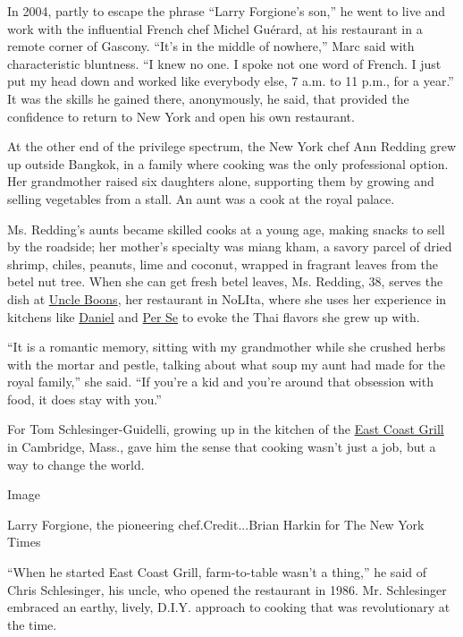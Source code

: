 In 2004, partly to escape the phrase ``Larry Forgione's son,'' he went
to live and work with the influential French chef Michel Guérard, at his
restaurant in a remote corner of Gascony. ``It's in the middle of
nowhere,'' Marc said with characteristic bluntness. ``I knew no one. I
spoke not one word of French. I just put my head down and worked like
everybody else, 7 a.m. to 11 p.m., for a year.'' It was the skills he
gained there, anonymously, he said, that provided the confidence to
return to New York and open his own restaurant.

At the other end of the privilege spectrum, the New York chef Ann
Redding grew up outside Bangkok, in a family where cooking was the only
professional option. Her grandmother raised six daughters alone,
supporting them by growing and selling vegetables from a stall. An aunt
was a cook at the royal palace.

Ms. Redding's aunts became skilled cooks at a young age, making snacks
to sell by the roadside; her mother's specialty was miang kham, a savory
parcel of dried shrimp, chiles, peanuts, lime and coconut, wrapped in
fragrant leaves from the betel nut tree. When she can get fresh betel
leaves, Ms. Redding, 38, serves the dish at
\href{http://www.nytimes3xbfgragh.onion/2013/07/03/dining/reviews/restaurant-review-uncle-boons-in-nolita.html?pagewanted=all}{Uncle
Boons}, her restaurant in NoLIta, where she uses her experience in
kitchens like
\href{http://www.nytimes3xbfgragh.onion/2013/07/24/dining/reviews/restaurant-review-daniel-on-the-upper-east-side.html?pagewanted=all}{Daniel}
and
\href{http://www.nytimes3xbfgragh.onion/2011/10/12/dining/reviews/per-se-nyc-restaurant-review.html?pagewanted=all}{Per
Se} to evoke the Thai flavors she grew up with.

``It is a romantic memory, sitting with my grandmother while she crushed
herbs with the mortar and pestle, talking about what soup my aunt had
made for the royal family,'' she said. ``If you're a kid and you're
around that obsession with food, it does stay with you.''

For Tom Schlesinger-Guidelli, growing up in the kitchen of the
\href{http://eastcoastgrill.net/}{East Coast Grill} in Cambridge, Mass.,
gave him the sense that cooking wasn't just a job, but a way to change
the world.

Image

Larry Forgione, the pioneering chef.Credit...Brian Harkin for The New
York Times

``When he started East Coast Grill, farm-to-table wasn't a thing,'' he
said of Chris Schlesinger, his uncle, who opened the restaurant in 1986.
Mr. Schlesinger embraced an earthy, lively, D.I.Y. approach to cooking
that was revolutionary at the time.


